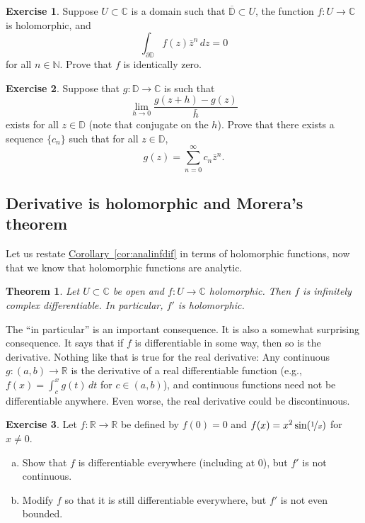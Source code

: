 \documentclass[12pt,openany]{book}
\newcommand{\C}{{\mathbb{C}}}
\newcommand{\R}{{\mathbb{R}}}
\newcommand{\N}{{\mathbb{N}}}
\newcommand{\D}{{\mathbb{D}}}
\newcommand{\myquote}[1]{``#1''}
\theoremstyle{plain}
\newtheorem{thm}{Theorem}[section]
\theoremstyle{remark}
\theoremstyle{definition}
\newenvironment{exbox}{%
    \def\FrameCommand{\vrule width 1pt \relax\hspace{10pt}}%
    \MakeFramed{\advance\hsize-\width\FrameRestore}%
}{%
    \endMakeFramed
}
\newenvironment{exparts}{%
    \leavevmode\begin{enumerate}[a),noitemsep,topsep=0pt,parsep=0pt,partopsep=0pt]
}{%
    \end{enumerate}
}
\theoremstyle{exercise}
\newtheorem{exercise}{Exercise}[section]
\theoremstyle{example}
\newcommand{\corref}[1]{\hyperref[#1]{Corollary~\ref*{#1}}}
\begin{document}
\begin{exbox}
\begin{exercise}
Suppose $U \subset \C$ is a domain such that $\overline{\D} \subset U$,
the function $f \colon U \to \C$ is holomorphic, and
\begin{equation*}
\int_{\partial \D} f(z) \bar{z}^n \, dz = 0
\end{equation*}
for all $n \in \N$.  Prove that $f$ is identically zero.
\end{exercise}

\begin{exercise}
\pagebreak[3]
Suppose that $g \colon \D \to \C$ is such that
\begin{equation*}
\lim_{h \to 0}
\frac{g(z+h)-g(z)}{\bar{h}}
\end{equation*}
exists for all $z \in \D$ (note that conjugate on the $h$).
Prove that there exists
a sequence $\{ c_n \}$ such that for all $z \in \D$,
\begin{equation*}
g(z) = \sum_{n=0}^\infty c_n \bar{z}^n .
\end{equation*}
\end{exercise}
\end{exbox}

\subsection{Derivative is holomorphic and Morera's theorem}

Let us restate \corref{cor:analinfdif} in terms of
holomorphic functions, now that we know that holomorphic functions are
analytic.

\begin{thm} \label{thm:holfuncinfder}
Let $U \subset \C$ be open and $f \colon U \to \C$ holomorphic.  Then
$f$ is infinitely complex differentiable.  In particular, $f'$ is
holomorphic.
\end{thm}

The \myquote{in particular} is an important consequence.  It is also a somewhat
surprising consequence.
It says that if $f$ is differentiable in some way,
then so is the derivative.  Nothing like that is true for the real
derivative:
Any continuous $g \colon (a,b) \to \R$ is the derivative
of a real differentiable function (e.g., $f(x) = \int_c^x g(t)\,dt$ for $c
\in (a,b)$),
and continuous functions need not be differentiable anywhere.
Even worse, the real derivative could be discontinuous.

\begin{exbox}
\begin{exercise}
Let $f \colon \R \to \R$ be defined by $f(0) = 0$ and $f(x) = x^2
\sin( \nicefrac{1}{x} )$ for $x \neq 0$.
\begin{exparts}
\item
Show that $f$ is
differentiable everywhere (including at $0$), but $f'$ is not continuous.
\item
Modify $f$ so that it is still differentiable everywhere, but $f'$ is not
even bounded.
\end{exparts}
\end{exercise}
\end{exbox}
\end{document}
